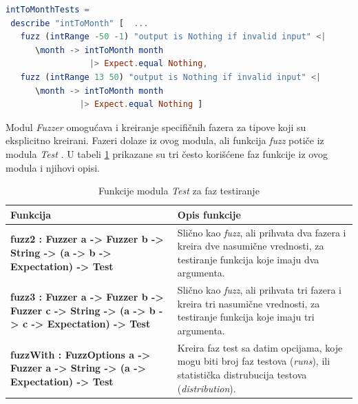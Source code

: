 \documentclass[12pt,oneside]{memoir}
\begin{document}
\begin{minipage}{\linewidth}
\begin{lstlisting}[language=elm, basicstyle=\small, caption={Implementacija faz testova za funkciju \emph{intToMonth}},captionpos=b, label={lst:faztest}]
intToMonthTests =
 describe "intToMonth" [  ...
   fuzz (intRange -50 -1) "output is Nothing if invalid input" <|
      \month -> intToMonth month
     	         |> Expect.equal Nothing, 
   fuzz (intRange 13 50) "output is Nothing if invalid input" <|
      \month -> intToMonth month
               |> Expect.equal Nothing ]
\end{lstlisting}
\end{minipage}

\par Modul \emph{Fuzzer} omogućava i kreiranje specifičnih fazera za tipove koji su eksplicitno kreirani. Fazeri dolaze iz ovog modula, ali funkcija \emph{fuzz} potiče iz modula \emph{Test} \cite{testmodul}. U tabeli \ref{tab:fuzzer} prikazane su tri često korišćene faz funkcije iz ovog modula i njihovi opisi.

\begin{table}[!htbp]
\centering
\caption{Funkcije modula \emph{Test} za faz testiranje}
\label{tab:fuzzer}
\begin{center}
\begin{tabular}{ | m{10cm} | m{10em} | } 
 \hline
\textbf{Funkcija} &  \textbf{Opis funkcije} \\ 
  \hline
 \small{\textbf{fuzz2 : Fuzzer a -> Fuzzer b -> String -> (a -> b -> Expectation) -> Test}} & \small{Slično kao \emph{fuzz}, ali prihvata dva fazera i kreira dve nasumične vrednosti, za testiranje funkcija koje imaju dva argumenta.} \\ 
  \hline
   \small{\textbf{fuzz3 :
    Fuzzer a
    -> Fuzzer b
    -> Fuzzer c
    -> String
    -> (a -> b -> c -> Expectation)
    -> Test}} & \small{Slično kao \emph{fuzz}, ali prihvata tri fazera i kreira tri nasumične vrednosti, za testiranje funkcija koje imaju tri argumenta.} \\ 
  \hline
 \small{\textbf{fuzzWith : FuzzOptions a -> Fuzzer a -> String -> (a -> Expectation) -> Test}} & \small{Kreira faz test sa datim opcijama, koje mogu biti broj faz testova (\textit{runs}), ili statistička distrubucija testova (\textit{distribution}).}  \\ 
\hline

\end{tabular}
\end{center}
\end{table}
\end{document}
